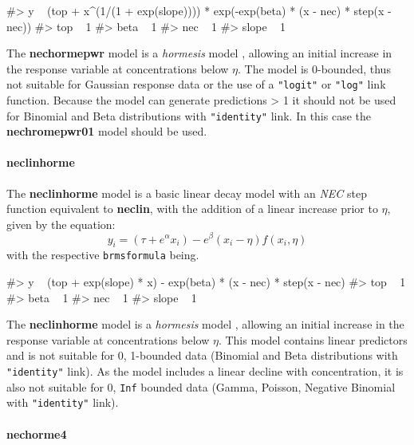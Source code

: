 \begin{Schunk}
\begin{Soutput}
#> y ~ (top + x^(1/(1 + exp(slope)))) * exp(-exp(beta) * (x - nec) * step(x - nec)) 
#> top ~ 1
#> beta ~ 1
#> nec ~ 1
#> slope ~ 1
\end{Soutput}
\end{Schunk}

The \textbf{nechormepwr} model is a \emph{hormesis} model
\citep{Mattson2008}, allowing an initial increase in the response
variable at concentrations below \(\eta\). The model is 0-bounded, thus
not suitable for Gaussian response data or the use of a \texttt{"logit"}
or \texttt{"log"} link function. Because the model can generate
predictions \textgreater{} 1 it should not be used for Binomial and Beta
distributions with \texttt{"identity"} link. In this case the
\textbf{nechromepwr01} model should be used.

\hypertarget{neclinhorme}{%
\paragraph{neclinhorme}\label{neclinhorme}}

The \textbf{neclinhorme} model is a basic linear decay model with an
\emph{NEC} step function equivalent to \textbf{neclin}, with the
addition of a linear increase prior to \(\eta\), given by the equation:
\[y_i = (\tau + e^{\alpha} x_i) - e^{\beta} \left(x_i - \eta \right) f(x_i, \eta)\]
with the respective \texttt{brmsformula} being.

\begin{Schunk}
\begin{Soutput}
#> y ~ (top + exp(slope) * x) - exp(beta) * (x - nec) * step(x - nec) 
#> top ~ 1
#> beta ~ 1
#> nec ~ 1
#> slope ~ 1
\end{Soutput}
\end{Schunk}

The \textbf{neclinhorme} model is a \emph{hormesis} model
\citep{Mattson2008}, allowing an initial increase in the response
variable at concentrations below \(\eta\). This model contains linear
predictors and is not suitable for 0, 1-bounded data (Binomial and Beta
distributions with \texttt{"identity"} link). As the model includes a
linear decline with concentration, it is also not suitable for 0,
\texttt{Inf} bounded data (Gamma, Poisson, Negative Binomial with
\texttt{"identity"} link).

\hypertarget{nechorme4}{%
\paragraph{nechorme4}\label{nechorme4}}


